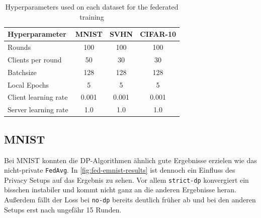 \begin{table}[tb]
	\centering
	\begin{tabular}{|l|c|c|c|}
		\hline
		Hyperparameter & MNIST & SVHN & CIFAR-10 \\
		\hline
		Rounds & 100 & 100 & 100 \\
		Clients per round & 50 & 30 & 30 \\
		Batchsize & 128 & 128 & 128 \\
		Local Epochs & 5 & 5 & 5 \\
		Client learning rate & 0.001 & 0.001 & 0.001 \\
		Server learning rate & 1.0 & 1.0 & 1.0 \\
		\hline
	\end{tabular}
	\caption{Hyperparameters used on each dataset for the federated training}
	\label{tab:fl-hyperparameters}
\end{table}

\subsection{MNIST}

Bei MNIST konnten die DP-Algorithmen ähnlich gute Ergebnisse erzielen wie das nicht-private \texttt{FedAvg}. In \autoref{fig:fed-emnist-results} ist dennoch ein Einfluss des Privacy Setups auf das Ergebnis zu sehen. Vor allem \texttt{strict-dp} konvergiert ein bisschen instabiler und kommt nicht ganz an die anderen Ergebnisse heran. Außerdem fällt der Loss bei \texttt{no-dp} bereits deutlich früher ab und bei den anderen Setups erst nach ungefähr 15 Runden.

